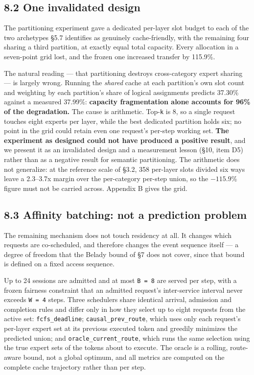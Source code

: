 \documentclass[
  10pt,
  letterpaper,
  10pt]{article}
\begin{document}
\subsection{8.2 One invalidated design}\label{one-invalidated-design}

The partitioning experiment gave a dedicated per-layer slot budget to
each of the two archetypes §5.7 identifies as genuinely cache-friendly,
with the remaining four sharing a third partition, at exactly equal
total capacity. Every allocation in a seven-point grid lost, and the
frozen one increased transfer by 115.9\%.

The natural reading --- that partitioning destroys cross-category expert
sharing --- is largely wrong. Running the \emph{shared} cache at each
partition's own slot count and weighting by each partition's share of
logical assignments predicts 37.30\% against a measured 37.99\%:
\textbf{capacity fragmentation alone accounts for 96\% of the
degradation.} The cause is arithmetic. Top-\texttt{k} is 8, so a single
request touches eight experts per layer, while the best dedicated
partition holds six; no point in the grid could retain even one
request's per-step working set. \textbf{The experiment as designed could
not have produced a positive result}, and we present it as an
invalidated design and a measurement lesson (§10, item D5) rather than
as a negative result for semantic partitioning. The arithmetic does not
generalize: at the reference scale of §3.2, 358 per-layer slots divided
six ways leave a 2.3--3.7x margin over the per-category per-step union,
so the \(-115.9\)\% figure must not be carried across. Appendix B gives
the grid.

\subsection{8.3 Affinity batching: not a prediction
problem}\label{affinity-batching-not-a-prediction-problem}

The remaining mechanism does not touch residency at all. It changes
which requests are co-scheduled, and therefore changes the event
sequence itself --- a degree of freedom that the Belady bound of §7 does
not cover, since that bound is defined on a fixed access sequence.

Up to 24 sessions are admitted and at most \texttt{B\ =\ 8} are served
per step, with a frozen fairness constraint that an admitted request's
inter-service interval never exceeds \texttt{W\ =\ 4} steps. Three
schedulers share identical arrival, admission and completion rules and
differ only in how they select up to eight requests from the active set:
\texttt{fcfs\_deadline}; \texttt{causal\_prev\_route}, which uses only
each request's per-layer expert set at its previous executed token and
greedily minimizes the predicted union; and
\texttt{oracle\_current\_route}, which runs the same selection using the
true expert sets of the tokens about to execute. The oracle is a
rolling, route-aware bound, not a global optimum, and all metrics are
computed on the complete cache trajectory rather than per step.
\end{document}
